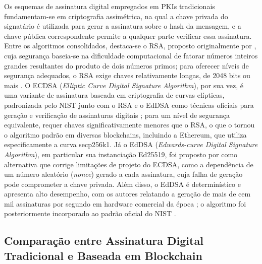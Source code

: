 \documentclass[
    12pt,
    a4paper,
    oneside,
    chapter=TITLE,
    section=TITLE,
    subsection=TITLE,
    subsubsection=TITLE,
    sumario=tradicional,
    english,
    brazil
]{abntex2}
\begin{document}
Os esquemas de assinatura digital empregados em PKIs tradicionais
fundamentam-se em criptografia assimétrica, na qual a chave privada
do signatário é utilizada para gerar a assinatura sobre o hash da
mensagem, e a chave pública correspondente permite a qualquer parte
verificar essa assinatura. Entre os algoritmos consolidados,
destaca-se o RSA, proposto originalmente por
, cuja segurança baseia-se na dificuldade
computacional de fatorar números inteiros grandes resultantes do
produto de dois números primos; para oferecer níveis de segurança
adequados, o RSA exige chaves relativamente longas, de 2048 bits ou
mais \cite{nist2023}. O ECDSA (\emph{Elliptic Curve Digital Signature
Algorithm}), por sua vez, é uma variante de assinatura baseada em
criptografia de curvas elípticas, padronizada pelo NIST junto com o
RSA e o EdDSA como técnicas oficiais para geração e verificação de
assinaturas digitais \cite{nist2023}; para um nível de segurança
equivalente, requer chaves significativamente menores que o RSA, o
que o tornou o algoritmo padrão em diversas blockchains, incluindo a
Ethereum, que utiliza especificamente a curva secp256k1. Já o EdDSA
(\emph{Edwards-curve Digital Signature Algorithm}), em particular sua
instanciação Ed25519, foi proposto por 
como alternativa que corrige limitações de projeto do ECDSA, como
a dependência de um número aleatório (\emph{nonce}) gerado a cada
assinatura, cuja falha de geração pode comprometer a chave privada.
Além disso, o EdDSA é determinístico e apresenta alto desempenho, com os
autores relatando a geração de mais de cem mil assinaturas por
segundo em hardware comercial da época \cite{bernstein2012}; o
algoritmo foi posteriormente incorporado ao padrão oficial do NIST
\cite{nist2023}.

\subsection{Comparação entre Assinatura Digital Tradicional e Baseada em Blockchain}
\label{sec:comparacao-pki}
\end{document}
